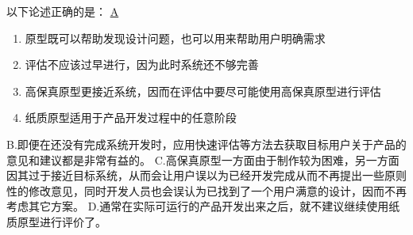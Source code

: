 \begin{problem}
	‍‍以下论述正确的是：
	\uline{A}    
        \begin{enumerate}[label=\Alph*.]
            \item 原型既可以帮助发现设计问题，也可以用来帮助用户明确需求
            \item 评估不应该过早进行，因为此时系统还不够完善
            \item 高保真原型更接近系统，因而在评估中要尽可能使用高保真原型进行评估
            \item 纸质原型适用于产品开发过程中的任意阶段
        \end{enumerate}
\end{problem}

\begin{solution}
B.即便在还没有完成系统开发时，应用快速评估等方法去获取目标用户关于产品的意见和建议都是非常有益的。  C.高保真原型一方面由于制作较为困难，另一方面因其过于接近目标系统，从而会让用户误以为已经开发完成从而不再提出一些原则性的修改意见，同时开发人员也会误认为已找到了一个用户满意的设计，因而不再考虑其它方案。  D.通常在实际可运行的产品开发出来之后，就不建议继续使用纸质原型进行评价了。
\end{solution}